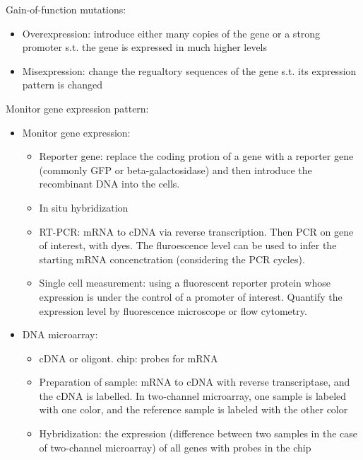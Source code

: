 \documentclass{report}
\begin{document}
Gain-of-function mutations:
\begin{itemize}
	\item Overexpression: introduce either many copies of the gene or a strong promoter s.t. the gene is expressed in much higher levels
	\item Misexpression: change the regualtory sequences of the gene s.t. its expression pattern is changed
\end{itemize}

Monitor gene expression pattern: 
\begin{itemize}
\item Monitor gene expression: 
\begin{itemize}
	\item Reporter gene: replace the coding protion of a gene with a reporter gene (commonly GFP or beta-galactosidase) and then introduce the recombinant DNA into the cells. 
	\item In situ hybridization
  \item RT-PCR: mRNA to cDNA via reverse transcription. Then PCR on gene of interest, with dyes. The fluroescence level can be used to infer the starting mRNA concenctration (considering the PCR cycles). 
  \item Single cell measurement: using a fluorescent reporter protein whose expression is under the control of a promoter of interest. Quantify the expression level by fluorescence microscope or flow cytometry. 
\end{itemize}

\item DNA microarray: 
\begin{itemize}
	\item cDNA or oligont. chip: probes for mRNA 
	\item Preparation of sample: mRNA to cDNA with reverse transcriptase, and the cDNA is labelled. In two-channel microarray, one sample is labeled with one color, and the reference sample is labeled with the other color
	\item Hybridization: the expression (difference between two samples in the case of two-channel microarray) of all genes with probes in the chip
\end{itemize}
\end{itemize}
\end{document}
